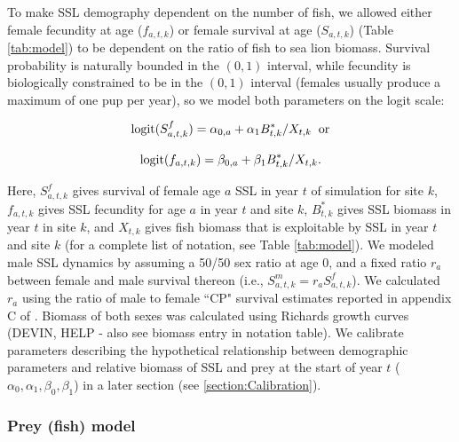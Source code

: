 \documentclass[nonumbib,leqno]{nrc1}
\begin{document}
To make SSL demography dependent on the number of fish, we allowed either female fecundity at age ($f_{a,t,k}$) or female survival at age ($S_{a,t,k}$) (Table \ref{tab:model}) to be dependent on the ratio of fish to sea lion biomass.  Survival probability is naturally bounded in the $(0,1)$ interval, while
fecundity is biologically constrained to be in the $(0,1)$ interval (females usually produce a maximum of one pup per year), so we model both parameters on the logit scale:
\begin{linenomath}
\begin{equation*}
{\rm logit}(S^f_{a,t,k})=\alpha_{0,a} + \alpha_1 B_{t,k}^*/X_{t,k} \hspace{2mm} {\rm or}
\end{equation*}
\end{linenomath}
\begin{linenomath}
\begin{equation*}
{\rm logit}(f_{a,t,k})=\beta_{0,a} + \beta_1 B_{t,k}^*/X_{t,k}.
\end{equation*}
\end{linenomath}
Here, $S^f_{a,t,k}$ gives survival of female age $a$ SSL in year $t$ of simulation for site $k$, $f_{a,t,k}$ gives SSL fecundity for age $a$ in year $t$ and site $k$, $B_{t,k}^*$ gives SSL biomass in year $t$ in site $k$, and $X_{t,k}$ gives fish biomass that is exploitable by SSL in year $t$ and site $k$ (for a complete list of notation, see Table \ref{tab:model}).  We modeled male SSL dynamics by assuming a 50/50 sex ratio at age 0, and a fixed ratio $r_a$ between female and male survival thereon (i.e., $S^m_{a,t,k}=r_a S^f_{a,t,k}$).  We calculated $r_a$ using the ratio of male to female ``CP" survival estimates reported in appendix C of \citet{HolmesEtAl2007}. Biomass of both sexes was calculated using Richards growth curves (DEVIN, HELP - also see biomass entry in notation table). We calibrate parameters describing the hypothetical relationship between demographic parameters and relative biomass of SSL and prey at the start of year $t$ ($\alpha_0,\alpha_1,\beta_0,\beta_1$) in a later section (see \ref{section:Calibration}).

\subsubsection{Prey (fish) model}
\end{document}
